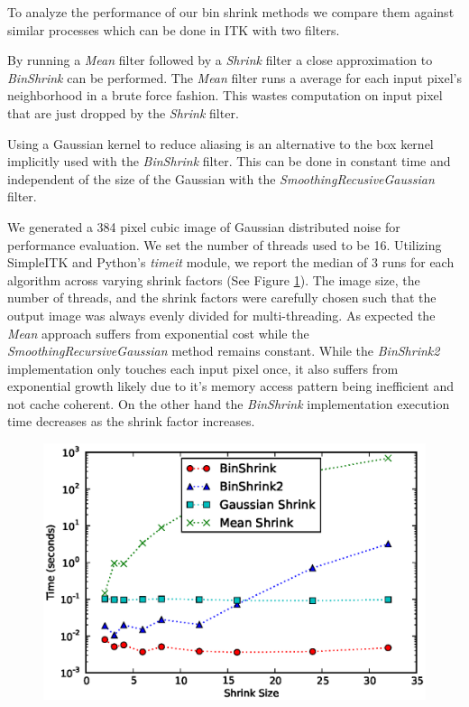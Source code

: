 \documentclass{InsightArticle}
\begin{document}
To analyze the performance of our bin shrink methods we compare them
against similar processes which can be done in ITK with two filters.

By running a \textit{Mean} filter followed by a \textit{Shrink} filter a
close approximation to \textit{BinShrink} can be performed. The
\textit{Mean} filter runs a average for each input pixel's
neighborhood in a brute force fashion. This wastes computation on input
pixel that are just dropped by the \textit{Shrink} filter.

Using a Gaussian kernel to reduce aliasing is an alternative to the box
kernel implicitly used with the \textit{BinShrink} filter. This can be
done in constant time and independent of the size of the Gaussian with
the \textit{SmoothingRecusiveGaussian} filter.

We generated a 384 pixel cubic image of Gaussian distributed noise for
performance evaluation. We set the number of threads used to be
16. Utilizing SimpleITK and Python's
\textit{timeit} module, we report the median of 3 runs for each
algorithm across varying shrink factors (See Figure
\ref{fig:ShrinkPerformance}).  The image size, the number of threads,
and the shrink factors were carefully chosen such that the output
image was always evenly divided for multi-threading. As expected the
\textit{Mean} approach suffers from exponential cost while the
\textit{SmoothingRecursiveGaussian} method remains constant. While the
\textit{BinShrink2} implementation only touches each input pixel once,
it also suffers from exponential growth likely due to it's memory
access pattern being inefficient and not cache coherent. On the other
hand the \textit{BinShrink} implementation execution time decreases as
the shrink factor increases.

\begin{figure}
  \centering
  \includegraphics[width=0.8\linewidth]{images/shrink_time}
  \label{fig:ShrinkPerformance}
\end{figure}
\end{document}
